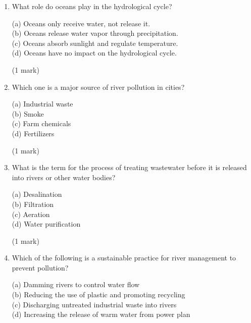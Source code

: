 \documentclass{article}
\begin{document}
\begin{enumerate}
    \item What role do oceans play in the hydrological cycle?
    
    (a) Oceans only receive water, not release it. \\
    (b) Oceans release water vapor through precipitation. \\
    (c) Oceans absorb sunlight and regulate temperature. \\
    (d) Oceans have no impact on the hydrological cycle. 

\hfill\raggedright (1 mark) 
\vspace{5pt}
\hline
\vspace{7pt}

    \item Which one is a major source of river pollution in cities?  

    (a) Industrial waste \\
    (b) Smoke \\
    (c) Farm chemicals   \\
    (d) Fertilizers 

\hfill\raggedright (1 mark) 
\vspace{5pt}
\hline
\vspace{7pt}

    \item What is the term for the process of treating wastewater before it is released into rivers or other water bodies?
    
    (a) Desalination \\
    (b) Filtration \\
    (c) Aeration \\
    (d) Water purification 

\hfill\raggedright (1 mark) 
\vspace{5pt}
\hline
\vspace{7pt}

\newpage

    \item Which of the following is a sustainable practice for river management to prevent pollution?
    
    (a) Damming rivers to control water flow \\
    (b) Reducing the use of plastic and promoting recycling \\
    (c) Discharging untreated industrial waste into rivers \\
    (d) Increasing the release of warm water from power plan


\end{enumerate}
\end{document}
